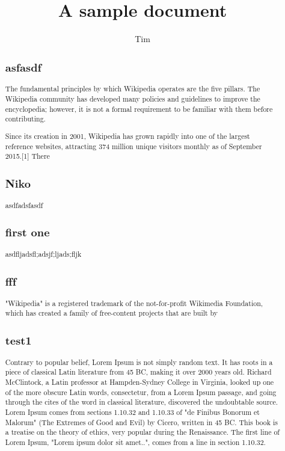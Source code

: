 \documentclass[11pt]{article}
\title{A sample document}
\author{Tim}
\begin{document}
\maketitle
\date

\newpage
\renewcommand{\abstractname}{Executive Summary}

\begin{abstract}
\subsection{ asfasdf }
The fundamental principles by which Wikipedia operates are the five pillars. The Wikipedia community has developed many policies and guidelines to improve the encyclopedia; however, it is not a formal requirement to be familiar with them before contributing.



Since its creation in 2001, Wikipedia has grown rapidly into one of the largest reference websites, attracting 374 million unique visitors monthly as of September 2015.[1] There 
\subsection{ Niko }
					asdfadsfasdf		
\subsection{ first one }
asdfljadsfl;adsjf;ljads;fljk

							
\subsection{ fff }
"Wikipedia" is a registered trademark of the not-for-profit Wikimedia Foundation, which has created a family of free-content projects that are built by 
\subsection{ test1 }
Contrary to popular belief, Lorem Ipsum is not simply random text. It has roots in a piece of classical Latin literature from 45 BC, making it over 2000 years old. Richard McClintock, a Latin professor at Hampden-Sydney College in Virginia, looked up one of the more obscure Latin words, consectetur, from a Lorem Ipsum passage, and going through the cites of the word in classical literature, discovered the undoubtable source. Lorem Ipsum comes from sections 1.10.32 and 1.10.33 of "de Finibus Bonorum et Malorum" (The Extremes of Good and Evil) by Cicero, written in 45 BC. This book is a treatise on the theory of ethics, very popular during the Renaissance. The first line of Lorem Ipsum, "Lorem ipsum dolor sit amet..", comes from a line in section 1.10.32.




\end{abstract}
\end{document}
